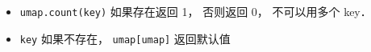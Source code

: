 
\begin{issues}
\issueDraft
\end{issues}

\begin{itemize}
\item \verb|umap.count(key)| 如果存在返回 1， 否则返回 0， 不可以用多个 key．
\item \verb|key| 如果不存在， \verb|umap[umap]| 返回默认值
\end{itemize}

